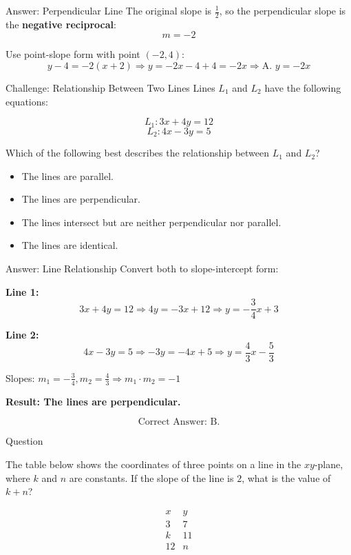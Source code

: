 \documentclass{beamer}
\begin{document}
\begin{frame}{Answer: Perpendicular Line}
The original slope is \( \frac{1}{2} \), so the perpendicular slope is the \textbf{negative reciprocal}:
\[
m = -2
\]

Use point-slope form with point \( (-2, 4) \):
\[
y - 4 = -2(x + 2) \Rightarrow y = -2x - 4 + 4 = -2x
\Rightarrow \boxed{\text{A. } y = -2x}
\]
\end{frame}


\begin{frame}{Challenge: Relationship Between Two Lines}
Lines \( L_1 \) and \( L_2 \) have the following equations:

\[
L_1: 3x + 4y = 12 
\]
\[
L_2: 4x - 3y = 5\]

Which of the following best describes the relationship between \( L_1 \) and \( L_2 \)?
\begin{itemize}
    \item[\textbf{A.}] The lines are parallel.
    \item[\textbf{B.}] The lines are perpendicular.
    \item[\textbf{C.}] The lines intersect but are neither perpendicular nor parallel.
    \item[\textbf{D.}] The lines are identical.
\end{itemize}
\end{frame}

\begin{frame}{Answer: Line Relationship}
Convert both to slope-intercept form:

\textbf{Line 1:}
\[
3x + 4y = 12 \Rightarrow 4y = -3x + 12 \Rightarrow y = -\frac{3}{4}x + 3
\]

\textbf{Line 2:}
\[
4x - 3y = 5 \Rightarrow -3y = -4x + 5 \Rightarrow y = \frac{4}{3}x - \frac{5}{3}
\]

Slopes: \( m_1 = -\frac{3}{4}, m_2 = \frac{4}{3} \Rightarrow m_1 \cdot m_2 = -1 \)

\textbf{Result: The lines are perpendicular.}

\[
\boxed{\text{Correct Answer: B.}}
\]
\end{frame}



\begin{frame}{Question}

\vspace{1em}

The table below shows the coordinates of three points on a line in the $xy$-plane, where $k$ and $n$ are constants. If the slope of the line is $2$, what is the value of $k + n$?

\vspace{1em}

\[
\begin{array}{c|c}
x & y \\
\hline
3 & 7 \\
k & 11 \\
12 & n \\
\end{array}
\]

\end{frame}
\end{document}
